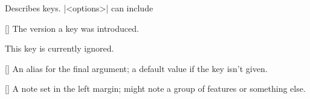 \documentclass{ltxguidex}
\begin{document}
Describes keys. |<options>| can include

\begin{keys}
	[]
	The version a key was introduced.

	\begin{warning}
		This key is currently ignored.
	\end{warning}

	[]
	An alias for the final argument; a default value if the key isn't
	given.

	[]
	A note set in the left margin; might note a group of features or
	something else.
\end{keys}
\end{document}
